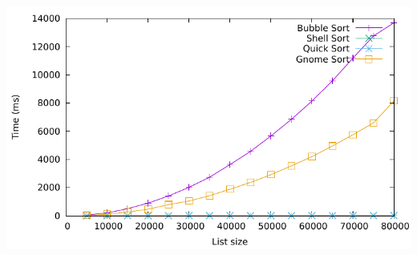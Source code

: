 \newsavebox{\plotsumtime}
\begin{lrbox}{\plotsumtime}
\href{P3.0}{\includegraphics[page=3,width=\linewidth]{labpal-plots.pdf}}
\end{lrbox}

